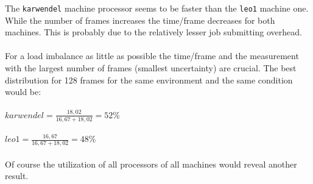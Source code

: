 \documentclass{article}
\begin{document}
The \texttt{karwendel} machine processor seems to be faster than the \texttt{leo1} machine one. While the number of frames increases the time/frame decreases for both machines. This is probably due to the relatively lesser job submitting overhead.
\\
\\
For a load imbalance as little as possible the time/frame and the measurement with the largest number of frames (smallest uncertainty) are crucial. The best distribution for 128 frames for the same environment and the same condition would be:
\\
\\
\(karwendel = \frac{18,02}{16,67 + 18,02} = 52\% \)
\\
\\
\(leo1      = \frac{16,67}{16,67 + 18,02} = 48\% \)
\\
\\
Of course the utilization of all processors of all machines would reveal another result.




%
\end{document}
